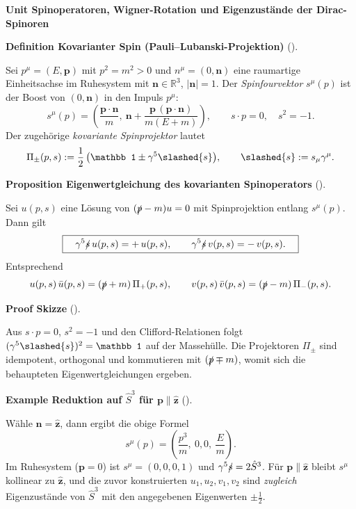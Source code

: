 \documentclass[10pt, letterpaper]{article}
\newcommand{\R}{\mathbb{R}}
\newcommand{\CustomHeading}[3]{%
  \par\medskip\noindent%
  \textbf{#1 #2} \textnormal{(#3)}.\enskip%
}
\newenvironment{DEF}[2]{\begin{unitbox}\CustomHeading{Definition}{#1}{#2}}{\end{unitbox}}
\newenvironment{PROP}[2]{\begin{unitbox}\CustomHeading{Proposition}{#1}{#2}}{\end{unitbox}}
\newenvironment{EXA}[2]{\begin{unitbox}\CustomHeading{Example}{#1}{#2}}{\end{unitbox}}
\newenvironment{PROOF}[2]{\begin{unitbox}\CustomHeading{Proof}{#1}{#2}}{\end{unitbox}}
\newenvironment{unit}[1]
  {\begin{unitbox}\textbf{Unit #1}\par\smallskip}
  {\end{unitbox}}
\begin{document}
\begin{unit}{Spinoperatoren, Wigner-Rotation und Eigenzustände der Dirac-Spinoren}
\begin{DEF}{Kovarianter Spin (Pauli–Lubanski-Projektion)}{}
Sei $p^\mu=(E,\mathbf p)$ mit $p^2=m^2>0$ und $n^\mu=(0,\mathbf n)$ eine raumartige Einheitsachse im Ruhesystem mit $\mathbf n\in\R^3$, $|\mathbf n|=1$. Der \emph{Spinfourvektor} $s^\mu(p)$ ist der Boost von $(0,\mathbf n)$ in den Impuls $p^\mu$:
\[
s^\mu(p) = \left(\frac{\mathbf p\cdot \mathbf n}{m},\ 
\mathbf n + \frac{\mathbf p\,(\mathbf p\cdot \mathbf n)}{m(E+m)}\right),
\qquad
s\cdot p=0,\quad s^2=-1.
\]
Der zugehörige \emph{kovariante Spinprojektor} lautet
\[
\Pi_{\pm}(p,s):=\frac{1}{2}\,\big(\mathbb 1 \pm \gamma^5 \slashed{s}\big),\qquad \slashed{s}:=s_\mu\gamma^\mu.
\]
\end{DEF}

\begin{PROP}{Eigenwertgleichung des kovarianten Spinoperators}{}
Sei $u(p,s)$ eine Lösung von $(\slashed{p}-m)u=0$ mit Spinprojektion entlang $s^\mu(p)$. Dann gilt
\[
\boxed{\quad \gamma^5 \slashed{s}\, u(p,s) = +\,u(p,s),\qquad
\gamma^5 \slashed{s}\, v(p,s) = -\,v(p,s). \quad}
\]
Entsprechend
\[
u(p,s)\,\bar u(p,s)= (\slashed{p}+m)\,\Pi_{+}(p,s),\qquad
v(p,s)\,\bar v(p,s)= (\slashed{p}-m)\,\Pi_{-}(p,s).
\]
\end{PROP}

\begin{PROOF}{Skizze}{}
Aus $s\cdot p=0$, $s^2=-1$ und den Clifford-Relationen folgt $(\gamma^5\slashed{s})^2=\mathbb 1$ auf der Massehülle. Die Projektoren $\Pi_{\pm}$ sind idempotent, orthogonal und kommutieren mit $(\slashed{p}\mp m)$, womit sich die behaupteten Eigenwertgleichungen ergeben.
\end{PROOF}

\begin{EXA}{Reduktion auf $\hat S^3$ für $\mathbf p\parallel \hat{\mathbf z}$}{}
Wähle $\mathbf n=\hat{\mathbf z}$, dann ergibt die obige Formel
\[
s^\mu(p)=\left(\frac{p^3}{m},\ 0,0,\ \frac{E}{m}\right).
\]
Im Ruhesystem ($\mathbf p=0$) ist $s^\mu=(0,0,0,1)$ und $\gamma^5\slashed{s}=2\hat S^3$. Für $\mathbf p\parallel \hat{\mathbf z}$ bleibt $s^\mu$ kollinear zu $\hat{\mathbf z}$, und die zuvor konstruierten $u_1,u_2,v_1,v_2$ sind \emph{zugleich} Eigenzustände von $\hat S^3$ mit den angegebenen Eigenwerten $\pm\tfrac12$.
\end{EXA}


\end{unit}
\end{document}
